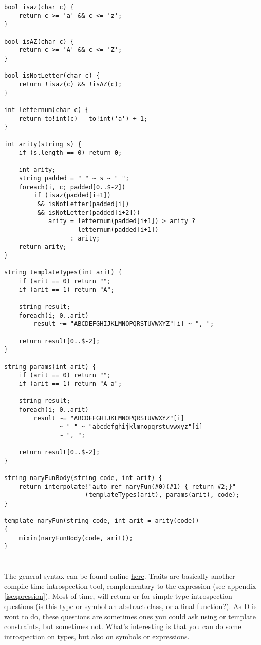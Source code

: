 \begin{verbatim}
bool isaz(char c) {
    return c >= 'a' && c <= 'z';
}

bool isAZ(char c) {
    return c >= 'A' && c <= 'Z';
}

bool isNotLetter(char c) {
    return !isaz(c) && !isAZ(c);
}

int letternum(char c) {
    return to!int(c) - to!int('a') + 1;
}

int arity(string s) {
    if (s.length == 0) return 0;

    int arity;
    string padded = " " ~ s ~ " ";
    foreach(i, c; padded[0..$-2])
        if (isaz(padded[i+1]) 
         && isNotLetter(padded[i]) 
         && isNotLetter(padded[i+2]))
            arity = letternum(padded[i+1]) > arity ? 
                    letternum(padded[i+1]) 
                  : arity;
    return arity;
}

string templateTypes(int arit) {
    if (arit == 0) return "";
    if (arit == 1) return "A";

    string result;
    foreach(i; 0..arit)
        result ~= "ABCDEFGHIJKLMNOPQRSTUVWXYZ"[i] ~ ", ";

    return result[0..$-2];
}

string params(int arit) {
    if (arit == 0) return "";
    if (arit == 1) return "A a";

    string result;
    foreach(i; 0..arit)
        result ~= "ABCDEFGHIJKLMNOPQRSTUVWXYZ"[i]
               ~ " " ~ "abcdefghijklmnopqrstuvwxyz"[i]
               ~ ", ";

    return result[0..$-2];
}

string naryFunBody(string code, int arit) {
    return interpolate!"auto ref naryFun(#0)(#1) { return #2;}"
                      (templateTypes(arit), params(arit), code);
}

template naryFun(string code, int arit = arity(code))
{
    mixin(naryFunBody(code, arit));
}
\end{verbatim}

\section{}\label{traits}

The general  syntax can be found online \href{www.d-programming.org/traits.html}{here}. Traits are basically another compile-time introspection tool, complementary to the  expression (see appendix \ref{isexpression}). Most of time,  will return  or  for simple type-introspection questions (is this type or symbol an abstract class, or a final function?). As D is wont to do, these questions are sometimes ones you could ask using  or template constraints, but sometimes not. What's interesting is that you can do some introspection on types, but also on symbols or expressions.

